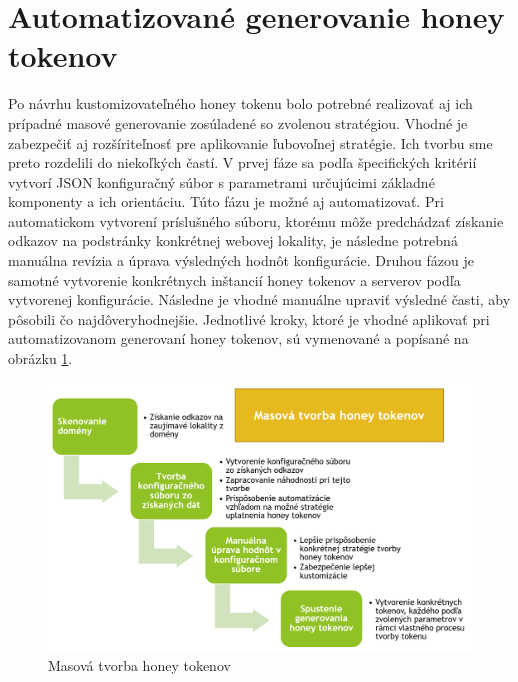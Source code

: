 \documentclass[conference, 11pt,slovak,a4paper,twoside]{IEEEtran}
\begin{document}
\section{Automatizované generovanie honey tokenov} \label{automaticGeneratingOfHoneyTokens}

Po návrhu kustomizovateľného honey tokenu bolo potrebné realizovať aj ich prípadné masové generovanie zosúladené so zvolenou stratégiou. Vhodné je zabezpečiť aj rozšíriteľnosť pre aplikovanie ľubovoľnej stratégie. Ich tvorbu sme preto rozdelili do niekoľkých častí. V prvej fáze sa podľa špecifických kritérií vytvorí JSON konfiguračný súbor s parametrami určujúcimi základné komponenty a ich orientáciu. Túto fázu je možné aj automatizovať. Pri automatickom vytvorení príslušného súboru, ktorému môže predchádzať získanie odkazov na podstránky konkrétnej webovej lokality, je následne potrebná manuálna revízia a úprava výsledných hodnôt konfigurácie. Druhou fázou je samotné vytvorenie konkrétnych inštancií honey tokenov a serverov podľa vytvorenej konfigurácie. Následne je vhodné manuálne upraviť výsledné časti, aby pôsobili čo najdôveryhodnejšie. Jednotlivé kroky, ktoré je vhodné aplikovať pri automatizovanom generovaní honey tokenov, sú vymenované a popísané na obrázku \ref{massHoneyTokenProduction}.

\begin{figure}[!t]  %
					\begin{center}
									\includegraphics[width=\linewidth]{fig/massTokenGeneration.png}
									\caption{Masová tvorba honey tokenov}
									\label{massHoneyTokenProduction}
					\end{center}
\end{figure}
\end{document}
